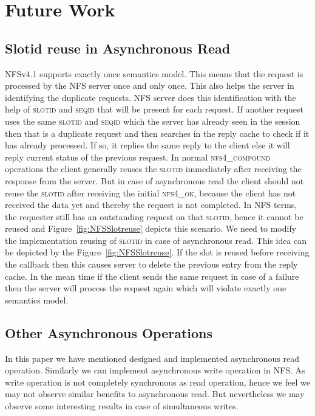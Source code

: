 \section{Future Work}
\subsection{Slotid reuse in Asynchronous Read}

NFSv4.1 supports exactly once semantics model. This means that the request is processed by the NFS server once and only once. This also helps the server in identifying the duplicate requests. NFS server does this identification with the help of \textsc{slotid} and \textsc{seqid} that will be present for each request. If another request uses the same \textsc{slotid} and \textsc{seqid} which the server has already seen in the session then that is a duplicate request and then searches in the reply cache to check if it has already processed. If so, it replies the same reply to the client else it will reply current status of the previous request. In normal \textsc{nfs4\_compound} operations the client generally reuses the \textsc{slotid} immediately after receiving the response from the server. But in case of asynchronous read the client should not reuse the \textsc{slotid} after receiving the initial \textsc{nfs4\_ok}, because the client has not received the data yet and thereby the request is not completed. In NFS terms, the requester still has an outstanding request on that \textsc{slotid}, hence it cannot be reused and Figure~\ref{fig:NFSSlotreuse} depicts this scenario. We need to modify the implementation reusing of \textsc{slotid} in case of asynchronous read. This idea can be depicted by the Figure~\ref{fig:NFSSlotreuse}. If the slot is reused before receiving the callback then this causes server to delete the previous entry from the reply cache. In the mean time if the client sends the same request in case of a failure then the server will process the request again which will violate exactly one semantics model.
	
\subsection{Other Asynchronous Operations}

	In this paper we have mentioned designed and implemented asynchronous read operation. Similarly we can implement asynchronous write operation in NFS. As write operation is not completely synchronous as read operation, hence we feel we may not observe similar benefits to asynchronous read. But nevertheless we may observe some interesting results in case of simultaneous writes. 
	
